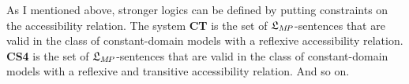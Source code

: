 
%


As I mentioned above, stronger logics can be defined by putting constraints on
the accessibility relation. The system \textbf{CT} is the set of
$\mathfrak{L}_{M\!P}$-sentences that are valid in the class of constant-domain 
models with a reflexive accessibility relation. \textbf{CS4} is the set of
$\mathfrak{L}_{M\!P}$-sentences that are valid in the class of constant-domain 
models with a reflexive and transitive accessibility relation. And so on.

